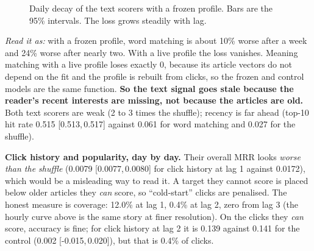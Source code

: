 \documentclass[11pt,a4paper]{article}
\newcommand{\ci}[2]{[#1,\,#2]}
\begin{document}
\begin{figure}[H]
\centering
{}
\caption{Daily decay of the text scorers with a frozen profile. Bars are the 95\% intervals. The loss grows steadily with lag.}
\end{figure}
\textit{Read it as:} with a frozen profile, word matching is about 10\% worse after a week and 24\% worse after nearly two. With a live profile the loss vanishes. Meaning matching with a live profile loses exactly 0, because its article vectors do not depend on the fit and the profile is rebuilt from clicks, so the frozen and control models are the same function. \textbf{So the text signal goes stale because the reader's recent interests are missing, not because the articles are old.} Both text scorers are weak (2 to 3 times the shuffle); recency is far ahead (top-10 hit rate 0.515 \ci{0.513}{0.517} against 0.061 for word matching and 0.027 for the shuffle).

\textbf{Click history and popularity, day by day.} Their overall MRR looks \emph{worse than the shuffle} (0.0079 \ci{0.0077}{0.0080} for click history at lag 1 against 0.0172), which would be a misleading way to read it. A target they cannot score is placed below older articles they \emph{can} score, so ``cold-start'' clicks are penalised. The honest measure is coverage: 12.0\% at lag 1, 0.4\% at lag 2, zero from lag 3 (the hourly curve above is the same story at finer resolution). On the clicks they \emph{can} score, accuracy is fine; for click history at lag 2 it is 0.139 against 0.141 for the control (0.002 \ci{-0.015}{0.020}), but that is 0.4\% of clicks.
\end{document}
